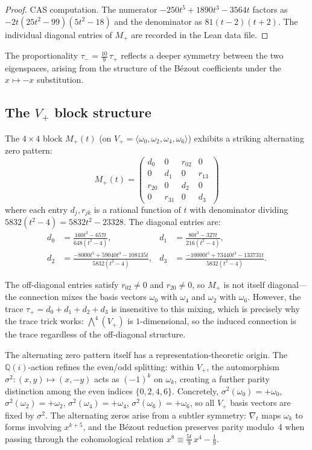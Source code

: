 \documentclass[11pt]{article}
\theoremstyle{plain}
\theoremstyle{definition}
\theoremstyle{remark}
\newcommand{\Q}{\mathbb{Q}}
\begin{document}
\begin{proof}
CAS computation. The numerator $-250t^5 + 1890t^3 - 3564t$ factors as
$-2t(25t^2 - 99)(5t^2 - 18)$ and the denominator as $81(t-2)(t+2)$.
The individual diagonal entries of $M_+$ are recorded in the Lean data file.
\end{proof}

The proportionality $\tau_- = \tfrac{10}{9}\, \tau_+$ reflects a deeper
symmetry between the two eigenspaces, arising from the structure of the
B\'ezout coefficients under the $x \mapsto -x$ substitution.

\subsection{The $V_+$ block structure}

The $4 \times 4$ block $M_+(t)$ (on $V_+ = \langle \omega_0, \omega_2,
\omega_4, \omega_6 \rangle$) exhibits a striking alternating zero pattern:
\[
M_+(t) = \begin{pmatrix}
d_0 & 0 & r_{02} & 0 \\
0 & d_1 & 0 & r_{13} \\
r_{20} & 0 & d_2 & 0 \\
0 & r_{31} & 0 & d_3
\end{pmatrix}
\]
where each entry $d_j, r_{jk}$ is a rational function of $t$ with denominator
dividing $5832(t^2 - 4) = 5832 t^2 - 23328$. The diagonal entries are:
\begin{align*}
d_0 &= \frac{160t^3 - 657t}{648(t^2 - 4)}, &
d_1 &= \frac{80t^3 - 327t}{216(t^2 - 4)}, \\
d_2 &= \frac{-8000t^5 + 59040t^3 - 108135t}{5832(t^2 - 4)}, &
d_3 &= \frac{-10000t^5 + 73440t^3 - 133731t}{5832(t^2 - 4)}.
\end{align*}

The off-diagonal entries satisfy $r_{02} \neq 0$ and $r_{20} \neq 0$,
so $M_+$ is not itself diagonal---the connection mixes the basis vectors
$\omega_0$ with $\omega_4$ and $\omega_2$ with $\omega_6$. However, the
trace $\tau_+ = d_0 + d_1 + d_2 + d_3$ is insensitive to this mixing,
which is precisely why the trace trick works: $\bigwedge^4(V_+)$ is
$1$-dimensional, so the induced connection is the trace regardless of
the off-diagonal structure.

The alternating zero pattern itself has a representation-theoretic origin.
The $\Q(i)$-action refines the even/odd splitting: within $V_+$,
the automorphism $\sigma^2: (x,y) \mapsto (x, -y)$ acts as $(-1)^k$
on $\omega_k$, creating a further parity distinction among the even
indices $\{0, 2, 4, 6\}$. Concretely, $\sigma^2(\omega_0) = +\omega_0$,
$\sigma^2(\omega_2) = +\omega_2$, $\sigma^2(\omega_4) = +\omega_4$,
$\sigma^2(\omega_6) = +\omega_6$, so all $V_+$ basis vectors are fixed
by $\sigma^2$. The alternating zeros arise from a subtler symmetry:
$\nabla_t$ maps $\omega_k$ to forms involving $x^{k+5}$, and the
B\'ezout reduction preserves parity modulo~4 when passing through
the cohomological relation $x^8 \equiv \tfrac{5t}{9}\, x^4 - \tfrac{1}{9}$.
\end{document}
